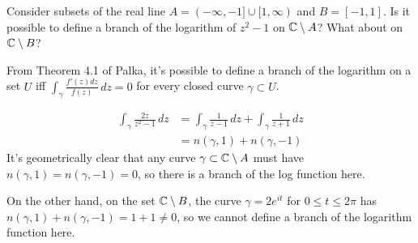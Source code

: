\documentclass{homework}
\begin{document}
                                                                                                                      \begin{problem}
                                                                                                                        Consider subsets of the real line $A = (-\infty,-1] \cup [1,\infty)$
                                                                                                                          and $B = [-1,1]$.  Is it possible to define a branch of the
                                                                                                                            logarithm of $z^2 - 1$ on $\mathbb{C} \setminus A$?  What about on
                                                                                                                              $\mathbb{C} \setminus B$?
                                                                                                                              \end{problem}
                                                                                                                              \begin{solution}
                                                                                                                              From Theorem 4.1 of Palka, it's possible to define a branch of the logarithm on a set $U$ iff $\int_{\gamma} \frac{f'(z)dz}{f(z)} \, dz= 0$ for every closed curve $\gamma\subset U$.

                                                                                                                              \begin{align*}
                                                                                                                                  \int_\gamma \frac{2z}{z^2 - 1}\, dz &=     \int_\gamma \frac{1}{z- 1}\,dz + \int_\gamma\frac{1}{z+1}\, dz\\
                                                                                                                                      &= n(\gamma, 1) + n(\gamma, -1)
                                                                                                                                      \end{align*}
                                                                                                                                      It's geometrically clear that any curve $\gamma\subset \mathbb{C}\setminus A$ must have $n(\gamma, 1) = n(\gamma, -1) = 0$, so there is a branch of the log function here.

                                                                                                                                      On the other hand, on the set $\mathbb{C}\setminus B$, the curve $\gamma = 2e^{it}$ for $0\leq t \leq 2\pi$ has $n(\gamma, 1)+ n(\gamma, -1) = 1 + 1 \neq 0$, so we cannot define a branch of the logarithm function here.
                                                                                                                                      \end{solution}
\end{document}
